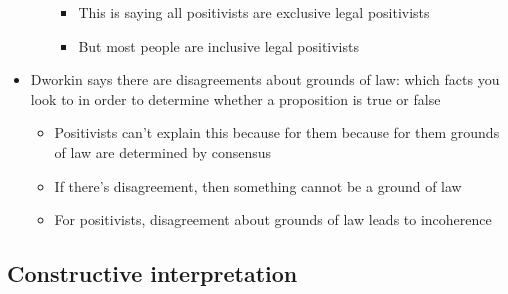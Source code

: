 \begin{itemize}
\begin{itemize}
    \begin{itemize}
    \tightlist
    \item
      This is saying all positivists are exclusive legal positivists
    \item
      But most people are inclusive legal positivists
    \end{itemize}
  \end{itemize}
\item
  Dworkin says there are disagreements about grounds of law: which facts
  you look to in order to determine whether a proposition is true or
  false

  \begin{itemize}
  \tightlist
  \item
    Positivists can't explain this because for them because for them
    grounds of law are determined by consensus
  \item
    If there's disagreement, then something cannot be a ground of law
  \item
    For positivists, disagreement about grounds of law leads to
    incoherence
  \end{itemize}
\end{itemize}

\hypertarget{constructive-interpretation}{%
\subsection{Constructive
interpretation}\label{constructive-interpretation}}

